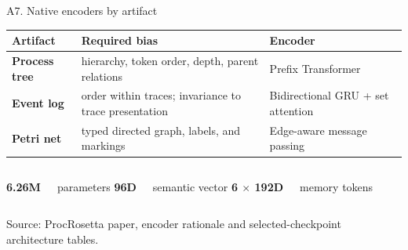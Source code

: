 \documentclass[aspectratio=169,12pt]{beamer}
\newcommand{\source}[1]{\vfill{\tiny\color{prgray}Source: #1\par}}
\begin{document}
\begin{frame}[t]{A7. Native encoders by artifact}
  \vspace{1mm}
  \centering
  \small
  \renewcommand{\arraystretch}{1.20}
  \setlength{\tabcolsep}{4pt}
  \begin{tabular}{@{}>{\bfseries}l
                      >{\raggedright\arraybackslash}p{}
                      >{\raggedright\arraybackslash}p{}@{}}
    \toprule
    Artifact & Required bias & Encoder \\
    \midrule
    Process tree & hierarchy, token order, depth, parent relations & Prefix Transformer \\
    Event log & order within traces; invariance to trace presentation & Bidirectional GRU + set attention \\
    Petri net & typed directed graph, labels, and markings & Edge-aware message passing \\
    \bottomrule
  \end{tabular}
  \vspace{7mm}
  \begin{columns}[c,onlytextwidth]
      {\fontsize{22}{25}\selectfont\bfseries\color{prblue}6.26M}\par
      \small parameters
      {\fontsize{22}{25}\selectfont\bfseries\color{prteal}96D}\par
      \small semantic vector
      {\fontsize{22}{25}\selectfont\bfseries\color{prgold}6 $\times$ 192D}\par
      \small memory tokens
  \end{columns}
  \source{ProcRosetta paper, encoder rationale and selected-checkpoint architecture tables.}
\end{frame}
\end{document}
